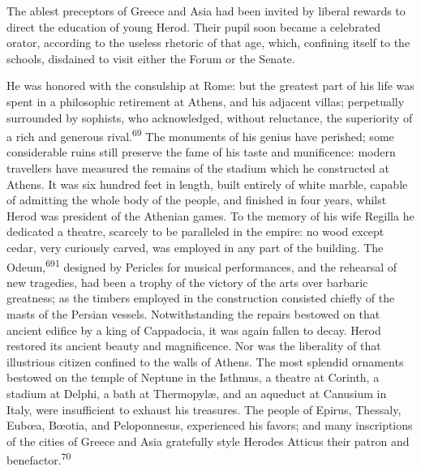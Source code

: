 
The ablest preceptors of Greece and Asia had been invited by
liberal rewards to direct the education of young Herod. Their
pupil soon became a celebrated orator, according to the useless
rhetoric of that age, which, confining itself to the schools,
disdained to visit either the Forum or the Senate.

He was honored with the consulship at Rome: but the greatest part
of his life was spent in a philosophic retirement at Athens, and
his adjacent villas; perpetually surrounded by sophists, who
acknowledged, without reluctance, the superiority of a rich and
generous rival.\textsuperscript{69} The monuments of his genius have perished;
some considerable ruins still preserve the fame of his taste and
munificence: modern travellers have measured the remains of the
stadium which he constructed at Athens. It was six hundred feet
in length, built entirely of white marble, capable of admitting
the whole body of the people, and finished in four years, whilst
Herod was president of the Athenian games. To the memory of his
wife Regilla he dedicated a theatre, scarcely to be paralleled in
the empire: no wood except cedar, very curiously carved, was
employed in any part of the building. The Odeum,\textsuperscript{691} designed by
Pericles for musical performances, and the rehearsal of new
tragedies, had been a trophy of the victory of the arts over
barbaric greatness; as the timbers employed in the construction
consisted chiefly of the masts of the Persian vessels.
Notwithstanding the repairs bestowed on that ancient edifice by a
king of Cappadocia, it was again fallen to decay. Herod restored
its ancient beauty and magnificence. Nor was the liberality of
that illustrious citizen confined to the walls of Athens. The
most splendid ornaments bestowed on the temple of Neptune in the
Isthmus, a theatre at Corinth, a stadium at Delphi, a bath at
Thermopylæ, and an aqueduct at Canusium in Italy, were
insufficient to exhaust his treasures. The people of Epirus,
Thessaly, Eubœa, Bœotia, and Peloponnesus, experienced his
favors; and many inscriptions of the cities of Greece and Asia
gratefully style Herodes Atticus their patron and benefactor.\textsuperscript{70}



